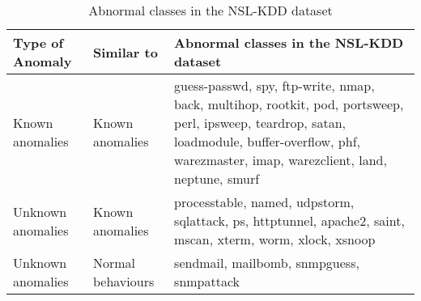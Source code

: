 \begin{table}[h]
\begin{center}
\begin{tabular}{| l | l | p{5cm} |}
\hline
Type of Anomaly & Similar to & Abnormal classes in the NSL-KDD dataset \\
\hline
Known anomalies & Known anomalies & guess-passwd, spy, ftp-write, nmap, back, multihop, rootkit, pod, portsweep, perl, ipsweep, teardrop, satan, loadmodule, buffer-overflow, phf, warezmaster, imap, warezclient, land, neptune, smurf \\ %
\hline
Unknown anomalies & Known anomalies & processtable, named, udpstorm, sqlattack, ps, httptunnel, apache2, saint, mscan, xterm, worm, xlock, xsnoop \\ %
\hline
Unknown anomalies & Normal behaviours & sendmail, mailbomb, snmpguess, snmpattack \\ %
\hline
\end{tabular}
\end{center}
\caption{Abnormal classes in the NSL-KDD dataset}
\label{fig:anomalyclasses}
\end{table}
